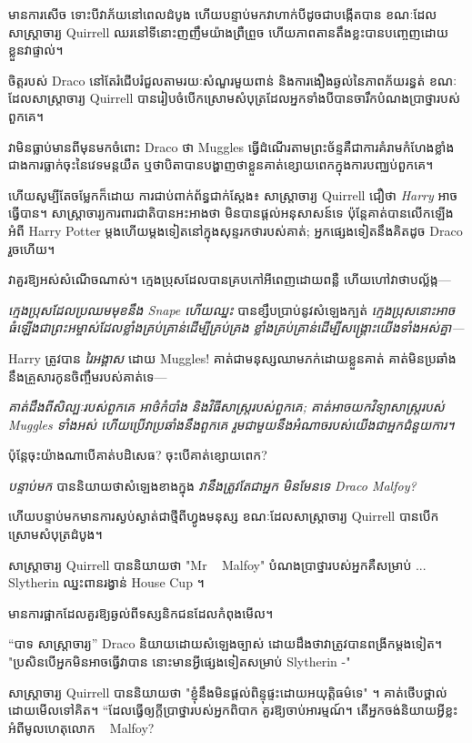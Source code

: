 {មានការសើច ទោះបីវាភ័យនៅពេលដំបូង ហើយបន្ទាប់មកវាហាក់បីដូចជាបង្កើតបាន ខណៈដែលសាស្រ្តាចារ្យ Quirrell ឈរនៅទីនោះញញឹមយ៉ាងព្រឺព្រួច ហើយភាពតានតឹងខ្លះបានបញ្ចេញដោយខ្លួនវាផ្ទាល់។

\later

ចិត្តរបស់ Draco នៅតែរំជើបរំជួលតាមរយៈសំណួរមួយពាន់ និងការងឿងឆ្ងល់នៃភាពភ័យរន្ធត់ ខណៈដែលសាស្រ្តាចារ្យ Quirrell បានរៀបចំបើកស្រោមសំបុត្រដែលអ្នកទាំងបីបានចារឹកបំណងប្រាថ្នារបស់ពួកគេ។

វាមិនធ្លាប់មានពីមុនមកចំពោះ Draco ថា Muggles ធ្វើដំណើរតាមព្រះច័ន្ទគឺជាការគំរាមកំហែងខ្លាំងជាងការធ្លាក់ចុះនៃវេទមន្តយឺត ឬថាបិតាបានបង្ហាញថាខ្លួនគាត់ខ្សោយពេកក្នុងការបញ្ឈប់ពួកគេ។

ហើយសូម្បីតែចម្លែកក៏ដោយ ការជាប់ពាក់ព័ន្ធជាក់ស្តែង៖ សាស្រ្តាចារ្យ Quirrell ជឿថា \emph{Harry} អាចធ្វើបាន។ សាស្ត្រាចារ្យការពារជាតិបានអះអាងថា មិនបានផ្តល់អនុសាសន៍ទេ ប៉ុន្តែគាត់បានលើកឡើងអំពី Harry Potter ម្តងហើយម្តងទៀតនៅក្នុងសុន្ទរកថារបស់គាត់; អ្នកផ្សេងទៀតនឹងគិតដូច Draco រួចហើយ។

វាគួរឱ្យអស់សំណើចណាស់។ ក្មេង​ប្រុស​ដែល​បាន​គ្រប​កៅអី​ពេញ​ដោយ​ពន្លឺ ហើយ​ហៅ​វា​ថា​បល្ល័ង្ក—

\emph{ក្មេងប្រុសដែលប្រឈមមុខនឹង Snape ហើយឈ្នះ} បានខ្សឹបប្រាប់នូវសំឡេងក្បត់ \emph{ក្មេងប្រុសនោះអាចធំឡើងជាព្រះអម្ចាស់ដែលខ្លាំងគ្រប់គ្រាន់ដើម្បីគ្រប់គ្រង ខ្លាំងគ្រប់គ្រាន់ដើម្បីសង្គ្រោះយើងទាំងអស់គ្នា—}

Harry ត្រូវបាន \emph{រៃអង្គាស} ដោយ Muggles! គាត់​ជា​មនុស្ស​ឈាម​ភក់​ដោយ​ខ្លួន​គាត់ គាត់​មិន​ប្រឆាំង​នឹង​គ្រួសារ​កូន​ចិញ្ចឹម​របស់​គាត់​ទេ—

\emph{គាត់ដឹងពីសិល្បៈរបស់ពួកគេ អាថ៌កំបាំង និងវិធីសាស្រ្តរបស់ពួកគេ; គាត់អាចយកវិទ្យាសាស្ត្ររបស់ Muggles ទាំងអស់ ហើយប្រើវាប្រឆាំងនឹងពួកគេ រួមជាមួយនឹងអំណាចរបស់យើងជាអ្នកជំនួយការ។}

ប៉ុន្តែចុះយ៉ាងណាបើគាត់បដិសេធ? ចុះបើគាត់ខ្សោយពេក?

\emph{បន្ទាប់មក} បាននិយាយថាសំឡេងខាងក្នុង \emph{វានឹងត្រូវតែជាអ្នក មិនមែនទេ Draco Malfoy?}

ហើយបន្ទាប់មកមានការស្ងប់ស្ងាត់ជាថ្មីពីហ្វូងមនុស្ស ខណៈដែលសាស្រ្តាចារ្យ Quirrell បានបើកស្រោមសំបុត្រដំបូង។

សាស្រ្តាចារ្យ Quirrell បាននិយាយថា "Mr ~ Malfoy" បំណងប្រាថ្នារបស់អ្នកគឺសម្រាប់ ... Slytherin ឈ្នះពានរង្វាន់ House Cup ។

មាន​ការ​ផ្អាក​ដែល​គួរ​ឱ្យ​ឆ្ងល់​ពី​ទស្សនិកជន​ដែល​កំពុង​មើល។

“បាទ សាស្រ្តាចារ្យ” Draco និយាយដោយសំឡេងច្បាស់ ដោយដឹងថាវាត្រូវបានពង្រីកម្តងទៀត។ "ប្រសិនបើអ្នកមិនអាចធ្វើវាបាន នោះមានអ្វីផ្សេងទៀតសម្រាប់ Slytherin -"

សាស្រ្តាចារ្យ Quirrell បាននិយាយថា "ខ្ញុំនឹងមិនផ្តល់ពិន្ទុផ្ទះដោយអយុត្តិធម៌ទេ" ។ គាត់ថើបថ្ពាល់ដោយមើលទៅគិត។ “ដែលធ្វើឲ្យក្តីប្រាថ្នារបស់អ្នកពិបាក គួរឱ្យចាប់អារម្មណ៍។ តើ​អ្នក​ចង់​និយាយ​អ្វី​ខ្លះ​អំពី​មូលហេតុ​លោក ~ Malfoy?

}
